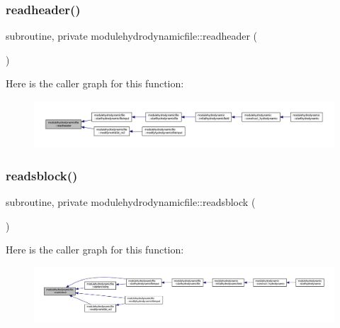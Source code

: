 \subsubsection{\texorpdfstring{readheader()}{readheader()}}
{\footnotesize\ttfamily subroutine, private modulehydrodynamicfile\+::readheader (\begin{DoxyParamCaption}{ }\end{DoxyParamCaption})\hspace{0.3cm}{\ttfamily [private]}}

Here is the caller graph for this function\+:\nopagebreak
\begin{figure}[H]
\begin{center}
\leavevmode
\includegraphics[width=350pt]{namespacemodulehydrodynamicfile_a6d9975e28fbe49117eab154fe46cdeca_icgraph}
\end{center}
\end{figure}
\mbox{\label{namespacemodulehydrodynamicfile_a51ac7b78492e92f6633e4889f1a47052}} 
\subsubsection{\texorpdfstring{readsblock()}{readsblock()}}
{\footnotesize\ttfamily subroutine, private modulehydrodynamicfile\+::readsblock (\begin{DoxyParamCaption}{ }\end{DoxyParamCaption})\hspace{0.3cm}{\ttfamily [private]}}

Here is the caller graph for this function\+:\nopagebreak
\begin{figure}[H]
\begin{center}
\leavevmode
\includegraphics[width=350pt]{namespacemodulehydrodynamicfile_a51ac7b78492e92f6633e4889f1a47052_icgraph}
\end{center}
\end{figure}
\mbox{\label{namespacemodulehydrodynamicfile_ab74a3df233aec6594db3ce069b1a2c25}} 
